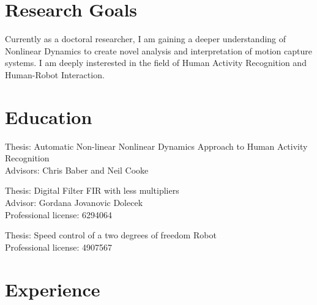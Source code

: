\documentclass[10pt,a4paper,sans]{moderncv}
\begin{document}
\makecvtitle

\section{Research Goals} 
Currently as a doctoral researcher, I am gaining a deeper understanding of Nonlinear 
Dynamics to create novel analysis and interpretation of motion capture systems.
I am deeply insterested in the field of Human Activity Recognition and Human-Robot
Interaction.
    
   

\section{Education}

  {Thesis: Automatic Non-linear Nonlinear Dynamics Approach to Human Activity Recognition
   \\ Advisors: Chris Baber and Neil Cooke} 

 {Thesis:
  Digital Filter FIR with less multipliers
  \href{https://sites.google.com/site/perezxochicale/docs/MScThesis.pdf}{\faFilePdfO}
  \\ Advisor: Gordana Jovanovic Dolecek\\ Professional license: 6294064}

  {Thesis: Speed control of a two degrees of freedom Robot
  \href{https://sites.google.com/site/perezxochicale/docs/BachelorProject.pdf}{\faFilePdfO}
  \\ Professional license: 4907567}

\section{Experience}
\end{document}
